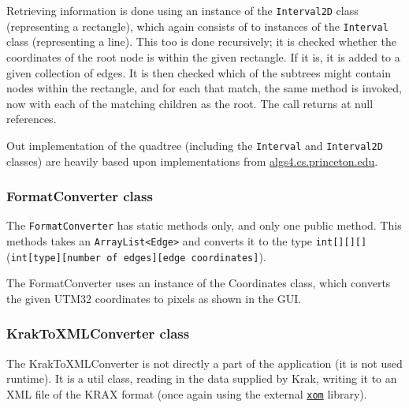 \documentclass[a4paper,11pt]{article}
\begin{document}
Retrieving information is done using an instance of the \texttt{Interval2D} class (representing a rectangle), which again consists of to instances of the \texttt{Interval} class (representing a line). This too is done recursively; it is checked whether the coordinates of the root node is within the given rectangle. If it is, it is added to a given collection of edges. It is then checked which of the subtrees might contain nodes within the rectangle, and for each that match, the same method is invoked, now with each of the matching children as the root. The call returns at null references.

Out implementation of the quadtree (including the \texttt{Interval} and \texttt{Interval2D} classes) are heavily based upon implementations from
\url{algs4.cs.princeton.edu}.


\subsubsection{FormatConverter class} %
The \texttt{FormatConverter} has static methods only, and only one public method. This methods takes an \texttt{ArrayList<Edge>} and converts it to the type \texttt{int[][][]} (\texttt{int[type][number of edges][edge coordinates]}).

The FormatConverter uses an instance of the Coordinates class, which converts the given UTM32 coordinates to pixels as shown in the GUI.

\subsubsection{KrakToXMLConverter class} %
The KrakToXMLConverter is not directly a part of the application (it is not used runtime). It is a util class, reading in the data supplied by Krak, writing it to an XML file of the KRAX format (once again using the external \href{www.xom.nu}{\texttt{xom}} library).
\end{document}
